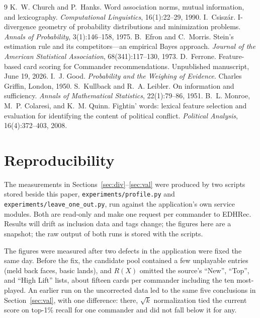 \documentclass[11pt]{article}
\theoremstyle{remark}
\begin{document}
\begin{thebibliography}{9}
 K.~W. Church and P.~Hanks. Word association norms, mutual
information, and lexicography. \emph{Computational Linguistics}, 16(1):22--29,
1990.
 I.~Csisz\'ar. I-divergence geometry of probability
distributions and minimization problems. \emph{Annals of Probability},
3(1):146--158, 1975.
 B.~Efron and C.~Morris. Stein's estimation rule and its
competitors---an empirical Bayes approach. \emph{Journal of the American
Statistical Association}, 68(341):117--130, 1973.
 D.~Ferrone. Feature-based card scoring for Commander
recommendations. Unpublished manuscript, June 19, 2026.
 I.~J. Good. \emph{Probability and the Weighing of Evidence}.
Charles Griffin, London, 1950.
 S.~Kullback and R.~A. Leibler. On information and sufficiency.
\emph{Annals of Mathematical Statistics}, 22(1):79--86, 1951.
 B.~L. Monroe, M.~P. Colaresi, and K.~M. Quinn. Fightin' words:
lexical feature selection and evaluation for identifying the content of
political conflict. \emph{Political Analysis}, 16(4):372--403, 2008.
\end{thebibliography}

\appendix
\section{Reproducibility}
\noindent The measurements in Sections~\ref{sec:div}--\ref{sec:val} were produced
by two scripts stored beside this paper, \texttt{experiments/profile.py} and
\texttt{experiments/leave\_one\_out.py}, run against the application's own
service modules. Both are read-only and make one request per commander to
EDHRec. Results will drift as inclusion data and tags change; the figures here
are a snapshot; the raw output of both runs is stored with the scripts.

The figures were measured after two defects in the application were fixed the
same day. Before the fix, the candidate pool contained a few unplayable entries
(meld back faces, basic lands), and $R(X)$ omitted the source's ``New'', ``Top'',
and ``High Lift'' lists, about fifteen cards per commander including the ten
most-played. An earlier run on the uncorrected data led to the same five
conclusions in Section~\ref{sec:val}, with one difference: there,
$\sqrt{k}$ normalization tied the current score on top-1\% recall for one
commander and did not fall below it for any.
\end{document}
